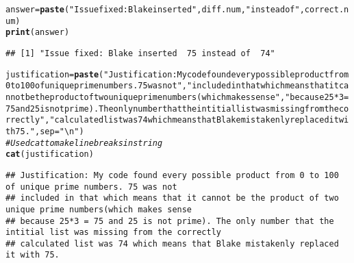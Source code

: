 \documentclass{article}\usepackage[]{graphicx}\usepackage[]{xcolor}
\makeatletter
\newcommand{\hlsng}[1]{\textcolor[rgb]{0.192,0.494,0.8}{#1}}%
\newcommand{\hlcom}[1]{\textcolor[rgb]{0.678,0.584,0.686}{\textit{#1}}}%
\newcommand{\hldef}[1]{\textcolor[rgb]{0.345,0.345,0.345}{#1}}%
\newcommand{\hlkwb}[1]{\textcolor[rgb]{0.69,0.353,0.396}{#1}}%
\newcommand{\hlkwc}[1]{\textcolor[rgb]{0.333,0.667,0.333}{#1}}%
\newcommand{\hlkwd}[1]{\textcolor[rgb]{0.737,0.353,0.396}{\textbf{#1}}}%
\newenvironment{kframe}{%
 \def\at@end@of@kframe{}%
 \ifinner\ifhmode%
  \def\at@end@of@kframe{\end{minipage}}%
  \begin{minipage}{\columnwidth}%
 \fi\fi%
 \def\FrameCommand##1{\hskip\@totalleftmargin \hskip-\fboxsep
 \colorbox{shadecolor}{##1}\hskip-\fboxsep
     \hskip-\linewidth \hskip-\@totalleftmargin \hskip\columnwidth}%
 \MakeFramed {\advance\hsize-\width
   \@totalleftmargin\z@ \linewidth\hsize
   \@setminipage}}%
 {\par\unskip\endMakeFramed%
 \at@end@of@kframe}
\newenvironment{knitrout}{}{} %
\makeatother
\begin{document}
\begin{enumerate}
\begin{knitrout}
\begin{kframe}
\begin{alltt}
\hldef{answer} \hlkwb{=} \hlkwd{paste}\hldef{(}\hlsng{"Issue fixed: Blake inserted "}\hldef{, diff.num,} \hlsng{"instead of "}\hldef{, correct.num)}
\hlkwd{print}\hldef{(answer)}
\end{alltt}
\begin{verbatim}
## [1] "Issue fixed: Blake inserted  75 instead of  74"
\end{verbatim}
\begin{alltt}
\hldef{justification} \hlkwb{=} \hlkwd{paste}\hldef{(}\hlsng{"Justification: My code found every possible product from 0 to 100 of unique prime numbers. 75 was not"}\hldef{,} \hlsng{"included in that which means that it cannot be the product of two unique prime numbers(which makes sense"}\hldef{,} \hlsng{"because 25*3 = 75 and 25 is not prime). The only number that the intitial list was missing from the correctly"}\hldef{,} \hlsng{"calculated list was 74 which means that Blake mistakenly replaced it with 75."}\hldef{,} \hlkwc{sep} \hldef{=} \hlsng{"\textbackslash{}n"}\hldef{)}
\hlcom{#Used cat to make line breaks in string}
\hlkwd{cat}\hldef{(justification)}
\end{alltt}
\begin{verbatim}
## Justification: My code found every possible product from 0 to 100 of unique prime numbers. 75 was not
## included in that which means that it cannot be the product of two unique prime numbers(which makes sense
## because 25*3 = 75 and 25 is not prime). The only number that the intitial list was missing from the correctly
## calculated list was 74 which means that Blake mistakenly replaced it with 75.
\end{verbatim}
\end{kframe}
\end{knitrout}
\end{enumerate}


\end{document}
